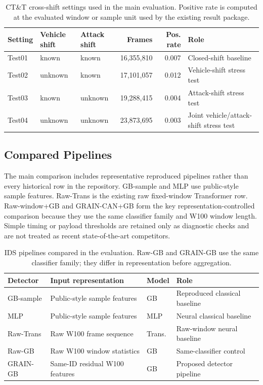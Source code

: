 \documentclass[runningheads]{llncs}
\newcommand{\method}{GRAIN-CAN}
\begin{document}
\begin{table}[t]
\centering
\caption{CT\&T cross-shift settings used in the main evaluation. Positive rate is computed at the evaluated window or sample unit used by the existing result package.}
\label{tab:settings}
\small
\setlength{\tabcolsep}{4pt}
\begin{tabularx}{\textwidth}{p{} p{} p{} r r X}
\toprule
Setting & Vehicle shift & Attack shift & Frames & Pos. rate & Role \\
\midrule
Test01 & known & known & 16,355,810 & 0.007 & Closed-shift baseline \\
Test02 & unknown & known & 17,101,057 & 0.012 & Vehicle-shift stress test \\
Test03 & known & unknown & 19,288,415 & 0.004 & Attack-shift stress test \\
Test04 & unknown & unknown & 23,873,695 & 0.003 & Joint vehicle/attack-shift stress test \\
\bottomrule
\end{tabularx}
\end{table}

\subsection{Compared Pipelines}
The main comparison includes representative reproduced pipelines rather than every historical row in the repository. GB-sample and MLP use public-style sample features. Raw-Trans is the existing raw fixed-window Transformer row. Raw-window+GB and \method{}+GB form the key representation-controlled comparison because they use the same classifier family and W100 window length. Simple timing or payload thresholds are retained only as diagnostic checks and are not treated as recent state-of-the-art competitors.

\begin{table}[H]
\centering
\caption{IDS pipelines compared in the evaluation. Raw-GB and GRAIN-GB use the same classifier family; they differ in representation before aggregation.}
\label{tab:pipelines}
\small
\setlength{\tabcolsep}{5pt}
\renewcommand{\arraystretch}{1.06}
\begin{tabularx}{\textwidth}{p{} X p{} p{}}
\toprule
Detector & Input representation & Model & Role \\
\midrule
GB-sample & Public-style sample features & GB & Reproduced classical baseline \\
MLP & Public-style sample features & MLP & Neural classical baseline \\
Raw-Trans & Raw W100 frame sequence & Trans. & Raw-window neural baseline \\
Raw-GB & Raw W100 window statistics & GB & Same-classifier control \\
GRAIN-GB & Same-ID residual W100 features & GB & Proposed detector pipeline \\
\bottomrule
\end{tabularx}
\end{table}
\end{document}
